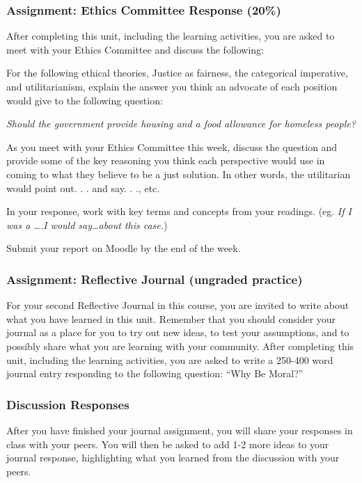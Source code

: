 \documentclass[
]{book}
\begin{document}
\begin{assessment}
\hypertarget{assignment-ethics-committee-response-20-2}{%
\subsubsection*{Assignment: Ethics Committee Response (20\%)}\label{assignment-ethics-committee-response-20-2}}

After completing this unit, including the learning activities, you are asked to
meet with your Ethics Committee and discuss the following:

For the following ethical theories, Justice as fairness, the categorical imperative, and utilitarianism, explain the answer you think an advocate of each position would give to the following question:

\emph{Should the government provide housing and a food allowance for homeless people?}

As you meet with your Ethics Committee this week, discuss the question and provide some of the key reasoning you think each perspective would use in coming to what they believe to be a just solution. In other words, the utilitarian would point out. . . and say. . ., etc.

In your response, work with key terms and concepts from your readings. (eg. \emph{If I was a \ldots.I would say\ldots about this case.})

Submit your report on Moodle by the end of the week.

\hypertarget{assignment-reflective-journal-ungraded-practice-1}{%
\subsubsection*{Assignment: Reflective Journal (ungraded practice)}\label{assignment-reflective-journal-ungraded-practice-1}}

For your second Reflective Journal in this course, you are invited to write about what you have learned in this unit. Remember that you should consider your journal as a place for you to try out new ideas, to test your assumptions, and to possibly share what you are learning with your community.
After completing this unit, including the learning activities, you are asked to write a 250-400 word journal entry responding to the following question: ``Why Be Moral?''

\hypertarget{discussion-responses-1}{%
\subsubsection*{Discussion Responses}\label{discussion-responses-1}}

After you have finished your journal assignment, you will share your responses in class with your peers. You will then be asked to add 1-2 more ideas to your journal response, highlighting what you learned from the discussion with your peers.
\end{assessment}
\end{document}
